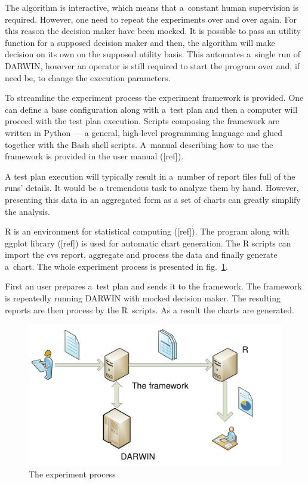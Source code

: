 The algorithm is interactive, which means that a~constant human supervision is
required. However, one need to repeat the experiments over and over again. For
this reason the decision maker have been mocked. It is possible to pass an
utility function for a supposed decision maker and then, the algorithm will
make decision on its own on the supposed utility basis. This automates
a~single run of DARWIN, however an operator is still required to start the
program over and, if need be, to change the execution parameters.

To streamline the experiment process the experiment framework is provided. One
can define a base configuration along with a~test plan and then a computer
will proceed with the test plan execution. Scripts composing the framework are
written in Python --- a general, high-level programming language and glued
together with the Bash shell scripts. A~manual describing how to use the
framework is provided in the user manual ([ref]).

A test plan execution will typically result in a~number of report files full
of the runs' details. It would be a tremendous task to analyze them by
hand. However, presenting this data in an aggregated form as a set of charts
can greatly simplify the analysis.

R is an environment for statistical computing ([ref]). The program along with
ggplot library ([ref]) is used for automatic chart generation. The R scripts
can import the cvs report, aggregate and process the data and finally generate
a~chart. The whole experiment process is presented in fig.~\ref{framework}.

First an user prepares a~test plan and sends it to the framework. The
framework is repeatedly running DARWIN with mocked decision maker. The
resulting reports are then process by the R~scripts. As a result the charts
are generated.

\begin{figure}
  \centering \includegraphics[width=\textwidth]{img/framework}
  \caption{The experiment process}
  \label{framework}
\end{figure}

